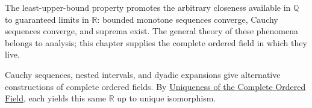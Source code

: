 \begin{remark}
\label{rem:what-completeness-buys}
The least-upper-bound property promotes the arbitrary closeness available in
$\mathbb{Q}$ to guaranteed limits in $\mathbb{R}$: bounded monotone sequences
converge, Cauchy sequences converge, and suprema exist. The general theory of
these phenomena belongs to analysis; this chapter supplies the complete ordered
field in which they live.
\end{remark}

\begin{remark}
\label{rem:parallel-constructions-forward}
Cauchy sequences, nested intervals, and dyadic expansions give alternative
constructions of complete ordered fields. By
\hyperref[thm:uniqueness-of-cof]{Uniqueness of the Complete Ordered Field},
each yields this same $\mathbb{R}$ up to unique isomorphism.
\end{remark}
